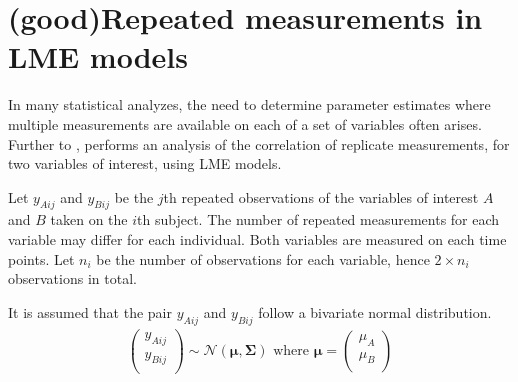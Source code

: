 \documentclass[12pt, a4paper]{report}
\theoremstyle{plain}
\theoremstyle{definition}
\theoremstyle{remark}
\begin{document}
			
%	
	
	
	
	

		\section{ (good)Repeated measurements in LME models}
		
		In many statistical analyzes, the need to determine parameter estimates where multiple measurements are available on each of a set of variables often arises. Further to \citet{lam}, \citet{hamlett} performs an analysis of the correlation of replicate measurements, for two variables of interest, using LME models.
		
		Let $y_{Aij}$ and $y_{Bij}$ be the $j$th repeated observations of the variables of interest $A$ and $B$ taken on the $i$th subject. The number of repeated measurements for each variable may differ for each individual.
		Both variables are measured on each time points. Let $n_{i}$ be the number of observations for each variable, hence $2\times n_{i}$ observations in total.
		
		It is assumed that the pair $y_{Aij}$ and $y_{Bij}$ follow a bivariate normal distribution.
		\begin{eqnarray*}
			\left(
			\begin{array}{c}
				y_{Aij} \\
				y_{Bij} \\
			\end{array}
			\right) \sim \mathcal{N}(
			\boldsymbol{\mu}, \boldsymbol{\Sigma})\mbox{   where } \boldsymbol{\mu} = \left(
			\begin{array}{c}
				\mu_{A} \\
				\mu_{B} \\
			\end{array}
			\right)
		\end{eqnarray*}
		
\end{document}
